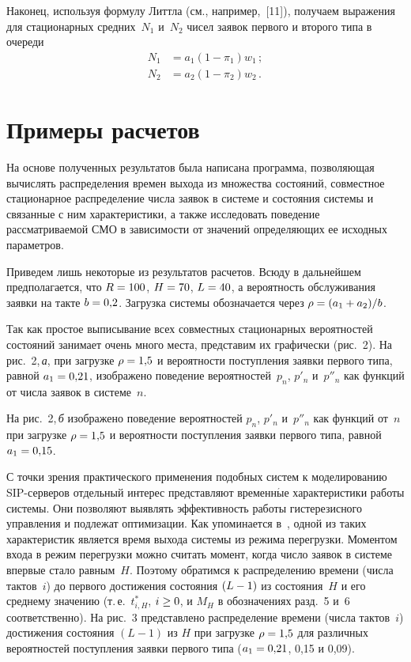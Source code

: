 \begin{multicols}{2}
Наконец, используя формулу Литтла (см., например,~[11]), получаем
выражения для стационарных средних~$N_1$ и~$N_2$
чисел заявок первого и второго типа в очереди
\begin{align*}
N_1&=a_1 (1 - \pi_1) w_1\,;
\\
N_2&=a_2 (1 - \pi_2) w_2\,.
\end{align*}


\vspace*{-12pt}

\section{Примеры расчетов}

На основе полученных результатов
была написана программа, позволяющая вычислять
распределения времен выхода из множества состояний,
совместное стационарное распределение
числа заявок в системе и состояния системы и
связанные с ним характеристики, а также исследовать
поведение рассматриваемой СМО в
зависимости от значений определяющих ее исходных параметров.

Приведем лишь некоторые из результатов расчетов.
Всюду в дальнейшем предполагается,
что ${R\hm=100}$, ${H\hm=70}$, ${L\hm=40}$,
а вероятность обслуживания заявки на такте ${b\hm=0{,}2}$.
Загрузка системы обозначается через
${\rho\hm=(a_1+a_2)/b}$.

Так как простое выписывание всех совместных
стационарных вероятностей
состояний занимает очень много места,
представим их графически (рис.~2).
На рис.~2,\,\textit{а}, при загрузке $\rho\hm=1{,}5$
и вероятности поступления заявки первого типа,
равной ${a_1\hm=0{,}21}$, изображено поведение
вероятностей~$p_n$, $p'_n$ и~$p''_n$ как функций
от числа заявок в системе~$n$.



На рис.~2,\,\textit{б} изображено поведение вероятностей
$p_n$, $p'_n$ и~$p''_n$ как функций от~$n$ при
загрузке ${\rho\hm=1{,}5}$  и вероятности поступления
заявки первого типа, равной ${a_1\hm=0{,}15}$.





С точки зрения практического применения
подобных систем к моделированию SIP-сер\-ве\-ров
отдельный интерес представляют временн$\acute{\mbox{ы}}$е характеристики работы системы.
Они позволяют выявлять эффективность работы
гистерезисного управления и подлежат оптимизации.
Как упоминается в~\cite{8-p}, одной из таких
характеристик является время выхода системы из режима перегрузки.
Моментом входа в режим перегрузки можно считать
момент, когда число заявок в системе
впервые стало равным~$H$.
Поэтому обратимся к
распределению времени (числа тактов~$i$) до
первого достижения состояния $(L\hm-1)$
из состояния~$H$ и его среднему значению
(т.\,е.\ $t^*_{i,H}$, ${i\hm\ge0}$, и $M_H$ в
обозначениях разд.~5 и~6 соответственно).
На рис.~3 представлено распределение времени
(числа тактов~$i$) достижения
состояния $(L-1)$ из $H$ при загрузке ${\rho\hm=1{,}5}$
для различных вероятностей поступления заявки
первого типа
($a_1\hm=0{,}21$, 0,15 и 0,09).




\end{multicols}

